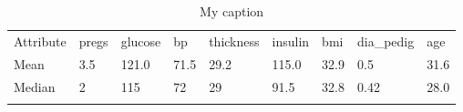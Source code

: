 \begin{table}[]
\centering
\caption{My caption}
\label{my-label}
\begin{tabular}{lllllllll}
\cline{1-1}
\multicolumn{1}{|l|}{Attribute} & pregs & glucose & bp   & thickness & insulin & bmi  & dia\_pedig & age  \\ \cline{1-1}
\multicolumn{1}{|l|}{Mean}      & 3.5   & 121.0   & 71.5 & 29.2      & 115.0   & 32.9 & 0.5        & 31.6 \\ \cline{1-1}
\multicolumn{1}{|l|}{Median}    & 2     & 115     & 72   & 29        & 91.5    & 32.8 & 0.42       & 28.0 \\ \cline{1-1}
                                                       &       &         &      &           &         &      &            &      \\ \hline
\end{tabular}
\end{table}
